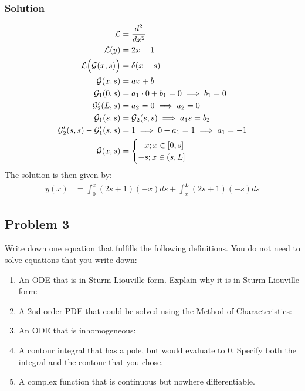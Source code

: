 \subsubsection*{Solution}
\begin{align*}
    \mathcal{L} &= \frac{d^2}{dx^2}\\
    \mathcal{L}(y) &= 2x + 1\\
    \mathcal{L}\Big(\mathcal{G}(x,s)\Big) &= \delta(x - s)\\
    \mathcal{G}(x,s) &= ax + b\\
    \mathcal{G}_1(0,s) &= a_1\cdot0+b_1 = 0\implies b_1 = 0\\
    \mathcal{G}_2'(L,s) &= a_2 = 0\implies a_2 = 0\\
    \mathcal{G}_1(s,s) &= \mathcal{G}_2(s,s)\implies a_1s =b_2\\
    \mathcal{G}_2'(s,s) - \mathcal{G}_1'(s,s) &= 1\implies 0 - a_1 = 1\implies a_1 = -1\\
    \mathcal{G}(x,s) &= \begin{cases}
        -x; x\in[0,s]\\
        -s; x\in(s,L]
    \end{cases}
\end{align*}The solution is then given by:
\begin{align*}
    y(x) &= \int_0^x (2s + 1)(-x)ds + \int_x^L(2s + 1)(-s)ds
\end{align*}

\subsection*{Problem 3}
Write down one equation that fulfills the following definitions. You do not need to solve equations that you write down:
\begin{enumerate}
    \item An ODE that is in Sturm-Liouville form. Explain why it is in Sturm Liouville form:
    \item A 2nd order PDE that could be solved using the Method of Characteristics:
    \item An ODE that is inhomogeneous:
    \item A contour integral that has a pole, but would evaluate to 0. Specify both the integral and the contour that you chose.
    \item A complex function that is continuous but nowhere differentiable.    
\end{enumerate}


